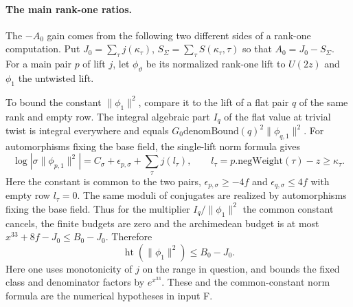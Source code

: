 \paragraph{The main rank-one ratios.}
The $-A_0$ gain comes from the following two different sides
of a rank-one computation. Put
$J_0=\sum_\tau j(\kappa_\tau)$,
$S_{\Sigma}=\sum_\tau S(\kappa_\tau,\tau)$ so that
$A_0=J_0-S_{\Sigma}$. For a main pair $p$ of lift $j$, let
$\phi_\vartheta$ be its normalized rank-one lift to $U(2z)$
and $\phi_1$ the untwisted lift.

To bound the constant $\|\phi_1\|^2$, compare it to the lift of a
flat pair $q$ of the same rank and empty row. The integral algebraic
part $I_q$ of the flat value at trivial twist is integral everywhere
and equals $G_0\mathrm{denomBound}(q)^2\|\phi_{q,1}\|^2$.
For automorphisms fixing the base field, the single-lift norm formula
gives
\[
 \log|\sigma\|\phi_{p,1}\|^2|
 =C_\sigma+\epsilon_{p,\sigma}
    +\sum_\tau j(l_\tau),\qquad
 l_\tau=p.\mathrm{negWeight}(\tau)-z\ge\kappa_\tau .
\]
Here the constant is common to the two pairs,
$\epsilon_{p,\sigma}\ge-4f$ and
$\epsilon_{q,\sigma}\le4f$ with empty row $l_\tau=0$.
The same moduli of conjugates are realized by automorphisms fixing
the base field. Thus for the multiplier $I_q/\|\phi_1\|^2$
the common constant cancels, the finite budgets are zero and the
archimedean budget is at most
$x^{33}+8f-J_0\le B_0-J_0$. Therefore
\begin{equation}\label{c3:main-arch}
 \operatorname{ht}(\|\phi_1\|^2)\le B_0-J_0 .
\end{equation}
Here one uses monotonicity of $j$ on the
range in question, and bounds the fixed class and denominator
factors by $e^{x^{33}}$. These and the common-constant norm formula
are the numerical hypotheses in input F.

